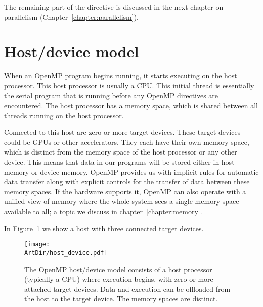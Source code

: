 The remaining part of the directive is discussed in the next chapter on parallelism (Chapter~\ref{chapter:parallelism}).


\section{Host/device model}
\label{sec:host_device_model}

When an OpenMP program begins running, it starts executing on the host processor.
This host processor is usually a CPU.
This initial thread is essentially the serial program that is running before any OpenMP directives are encountered.
The host processor has a memory space, which is shared between all threads running on the host processor.

Connected to this host are zero or more target devices. These target devices could be GPUs or other accelerators.
They each have their own memory space, which is distinct from the memory space of the host processor or any other device.
This means that data in our programs will be stored either in host memory or device memory.
OpenMP provides us with implicit rules for automatic data transfer along with explicit controls for the transfer of data between these memory spaces.
If the hardware supports it, OpenMP can also operate with a unified view of memory where the whole system sees a single memory space available to all; a topic we discuss in chapter~\ref{chapter:memory}.

In Figure~\ref{fig:host_device} we show a host with three connected target devices.

\begin{figure}[t]
\centerline{\texttt{[image: \\ArtDir/host\_device.pdf]}}
\caption[The OpenMP host/device model consits of a host processor (typically a CPU) where execution begins, with zero or more attached target devices.
Data and execution can be offloaded from the host to the target device.
The memory spaces are distinct.]
{The OpenMP host/device model consists of a host processor (typically a CPU) where execution begins, with zero or more attached target devices.
Data and execution can be offloaded from the host to the target device.
The memory spaces are distinct.}
\label{fig:host_device}
\end{figure}


